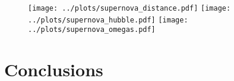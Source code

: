 \documentclass{aa}
\begin{document}
\begin{figure}
	\centering
	\texttt{[image: ../plots/supernova\_distance.pdf]}
	\texttt{[image: ../plots/supernova\_hubble.pdf]}
	\texttt{[image: ../plots/supernova\_omegas.pdf]}
\end{figure}

%

\section{Conclusions}


%
%
\end{document}
